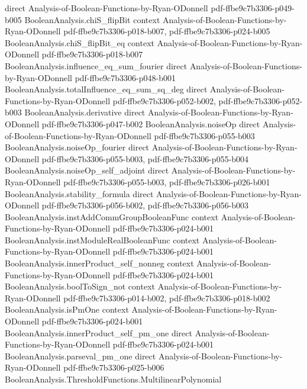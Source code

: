 \begin{theorem}
  {direct}
  {Analysis-of-Boolean-Functions-by-Ryan-ODonnell}
  {pdf-ffbe9c7b3306-p049-b005}
\proofstep
  {BooleanAnalysis.chiS_flipBit}
  {context}
  {Analysis-of-Boolean-Functions-by-Ryan-ODonnell}
  {pdf-ffbe9c7b3306-p018-b007,
    pdf-ffbe9c7b3306-p024-b005}
\proofstep
  {BooleanAnalysis.chiS_flipBit_eq}
  {context}
  {Analysis-of-Boolean-Functions-by-Ryan-ODonnell}
  {pdf-ffbe9c7b3306-p018-b007}
\proofstep
  {BooleanAnalysis.influence_eq_sum_fourier}
  {direct}
  {Analysis-of-Boolean-Functions-by-Ryan-ODonnell}
  {pdf-ffbe9c7b3306-p048-b001}
\proofstep
  {BooleanAnalysis.totalInfluence_eq_sum_sq_deg}
  {direct}
  {Analysis-of-Boolean-Functions-by-Ryan-ODonnell}
  {pdf-ffbe9c7b3306-p052-b002,
    pdf-ffbe9c7b3306-p052-b003}
\proofstep
  {BooleanAnalysis.derivative}
  {direct}
  {Analysis-of-Boolean-Functions-by-Ryan-ODonnell}
  {pdf-ffbe9c7b3306-p047-b002}
\proofstep
  {BooleanAnalysis.noiseOp}
  {direct}
  {Analysis-of-Boolean-Functions-by-Ryan-ODonnell}
  {pdf-ffbe9c7b3306-p055-b003}
\proofstep
  {BooleanAnalysis.noiseOp_fourier}
  {direct}
  {Analysis-of-Boolean-Functions-by-Ryan-ODonnell}
  {pdf-ffbe9c7b3306-p055-b003,
    pdf-ffbe9c7b3306-p055-b004}
\proofstep
  {BooleanAnalysis.noiseOp_self_adjoint}
  {direct}
  {Analysis-of-Boolean-Functions-by-Ryan-ODonnell}
  {pdf-ffbe9c7b3306-p055-b003,
    pdf-ffbe9c7b3306-p026-b001}
\proofstep
  {BooleanAnalysis.stability_formula}
  {direct}
  {Analysis-of-Boolean-Functions-by-Ryan-ODonnell}
  {pdf-ffbe9c7b3306-p056-b002,
    pdf-ffbe9c7b3306-p056-b003}
\proofstep
  {BooleanAnalysis.instAddCommGroupBooleanFunc}
  {context}
  {Analysis-of-Boolean-Functions-by-Ryan-ODonnell}
  {pdf-ffbe9c7b3306-p024-b001}
\proofstep
  {BooleanAnalysis.instModuleRealBooleanFunc}
  {context}
  {Analysis-of-Boolean-Functions-by-Ryan-ODonnell}
  {pdf-ffbe9c7b3306-p024-b001}
\proofstep
  {BooleanAnalysis.innerProduct_self_nonneg}
  {context}
  {Analysis-of-Boolean-Functions-by-Ryan-ODonnell}
  {pdf-ffbe9c7b3306-p024-b001}
\proofstep
  {BooleanAnalysis.boolToSign_not}
  {context}
  {Analysis-of-Boolean-Functions-by-Ryan-ODonnell}
  {pdf-ffbe9c7b3306-p014-b002,
    pdf-ffbe9c7b3306-p018-b002}
\proofstep
  {BooleanAnalysis.isPmOne}
  {context}
  {Analysis-of-Boolean-Functions-by-Ryan-ODonnell}
  {pdf-ffbe9c7b3306-p024-b001}
\proofstep
  {BooleanAnalysis.innerProduct_self_pm_one}
  {direct}
  {Analysis-of-Boolean-Functions-by-Ryan-ODonnell}
  {pdf-ffbe9c7b3306-p024-b001}
\proofstep
  {BooleanAnalysis.parseval_pm_one}
  {direct}
  {Analysis-of-Boolean-Functions-by-Ryan-ODonnell}
  {pdf-ffbe9c7b3306-p025-b006}
\proofstep
  {BooleanAnalysis.ThresholdFunctions.MultilinearPolynomial}

\end{theorem}
